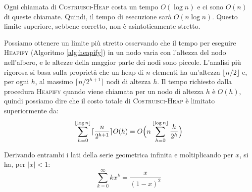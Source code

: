 \begin{center}
\begin{minipage}{.45\textwidth}
	\centering
\end{minipage}
\label{fig:costruisci-heap}
\end{center}

Ogni chiamata di \textsc{Costruisci-Heap} costa un tempo $O(\log n)$ e ci sono $O(n)$ di queste chiamate. Quindi, il tempo di esecuzione sarà $O(n \log n)$. Questo limite superiore, sebbene corretto, non è asintoticamente stretto.

Possiamo ottenere un limite più stretto osservando che il tempo per eseguire \textsc{Heapify} (Algoritmo \ref{alg:heapify}) in un nodo varia con l'altezza del nodo nell'albero, e le altezze della maggior parte dei nodi sono piccole. L'analisi più rigorosa si basa sulla proprietà che un heap di $n$ elementi ha un'altezza $\lfloor n/2 \rfloor$ e, per ogni $h$, al massimo $\lceil n/2^{h+1} \rceil$ nodi di altezza $h$. Il tempo richiesto dalla procedura \textsc{Heapify} quando viene chiamata per un nodo di altezza $h$ è $O(h)$, quindi possiamo dire che il costo totale di \textsc{Costruisci-Heap} è limitato superiormente da:
\begin{displaymath}
	\sum_{h=0}^{\lfloor \log n \rfloor} \lceil \frac{n}{2^{h+1}} \rceil O(h)= O\Bigl(n \sum_{h=0}^{\lfloor \log n \rfloor} \frac{h}{2^{h}} \Bigl)
\end{displaymath}


\begin{propbox}
	Derivando entrambi i lati della serie geometrica infinita e moltiplicando per $x$, si ha, 	per $|x|<1$:
	\begin{equation}\label{sommatoria:integrale}
		\sum_{k=0}^{\infty} kx^{k} = \frac{x}{{(1-x)}^{2}}
	\end{equation}
\end{propbox}

